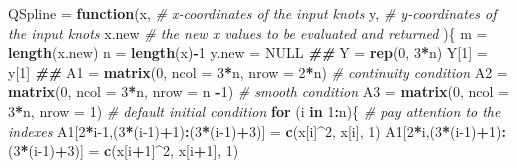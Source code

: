\documentclass[
]{book}
\newenvironment{Shaded}{\begin{snugshade}}{\end{snugshade}}
\newcommand{\AttributeTok}[1]{\textcolor[rgb]{0.13,0.29,0.53}{#1}}
\newcommand{\CommentTok}[1]{\textcolor[rgb]{0.56,0.35,0.01}{\textit{#1}}}
\newcommand{\ConstantTok}[1]{\textcolor[rgb]{0.56,0.35,0.01}{#1}}
\newcommand{\ControlFlowTok}[1]{\textcolor[rgb]{0.13,0.29,0.53}{\textbf{#1}}}
\newcommand{\DecValTok}[1]{\textcolor[rgb]{0.00,0.00,0.81}{#1}}
\newcommand{\DocumentationTok}[1]{\textcolor[rgb]{0.56,0.35,0.01}{\textbf{\textit{#1}}}}
\newcommand{\FunctionTok}[1]{\textcolor[rgb]{0.13,0.29,0.53}{\textbf{#1}}}
\newcommand{\NormalTok}[1]{#1}
\newcommand{\OtherTok}[1]{\textcolor[rgb]{0.56,0.35,0.01}{#1}}
\newcommand{\SpecialCharTok}[1]{\textcolor[rgb]{0.81,0.36,0.00}{\textbf{#1}}}
\begin{document}
\begin{Shaded}
\begin{Highlighting}[]
\NormalTok{QSpline }\OtherTok{=} \ControlFlowTok{function}\NormalTok{(x,        }\CommentTok{\# x{-}coordinates of the input knots}
\NormalTok{                   y,        }\CommentTok{\# y{-}coordinates of the input knots}
\NormalTok{                   x.new     }\CommentTok{\# the new x values to be evaluated and returned}
\NormalTok{              )\{}
\NormalTok{     m }\OtherTok{=} \FunctionTok{length}\NormalTok{(x.new)}
\NormalTok{     n }\OtherTok{=} \FunctionTok{length}\NormalTok{(x)}\SpecialCharTok{{-}}\DecValTok{1}
\NormalTok{     y.new }\OtherTok{=} \ConstantTok{NULL}
     \DocumentationTok{\#\#}
\NormalTok{     Y }\OtherTok{=} \FunctionTok{rep}\NormalTok{(}\DecValTok{0}\NormalTok{, }\DecValTok{3}\SpecialCharTok{*}\NormalTok{n)}
\NormalTok{     Y[}\DecValTok{1}\NormalTok{] }\OtherTok{=}\NormalTok{ y[}\DecValTok{1}\NormalTok{]}
     \DocumentationTok{\#\#}
\NormalTok{     A1 }\OtherTok{=} \FunctionTok{matrix}\NormalTok{(}\DecValTok{0}\NormalTok{, }\AttributeTok{ncol =} \DecValTok{3}\SpecialCharTok{*}\NormalTok{n, }\AttributeTok{nrow =} \DecValTok{2}\SpecialCharTok{*}\NormalTok{n)     }\CommentTok{\# continuity condition}
\NormalTok{     A2 }\OtherTok{=} \FunctionTok{matrix}\NormalTok{(}\DecValTok{0}\NormalTok{, }\AttributeTok{ncol =} \DecValTok{3}\SpecialCharTok{*}\NormalTok{n, }\AttributeTok{nrow =}\NormalTok{ n }\SpecialCharTok{{-}}\DecValTok{1}\NormalTok{)    }\CommentTok{\# smooth condition}
\NormalTok{     A3 }\OtherTok{=} \FunctionTok{matrix}\NormalTok{(}\DecValTok{0}\NormalTok{, }\AttributeTok{ncol =} \DecValTok{3}\SpecialCharTok{*}\NormalTok{n, }\AttributeTok{nrow =} \DecValTok{1}\NormalTok{)       }\CommentTok{\# default initial condition}
     \ControlFlowTok{for}\NormalTok{ (i }\ControlFlowTok{in} \DecValTok{1}\SpecialCharTok{:}\NormalTok{n)\{  }\CommentTok{\# pay attention to the indexes }
\NormalTok{       A1[}\DecValTok{2}\SpecialCharTok{*}\NormalTok{i}\DecValTok{{-}1}\NormalTok{,(}\DecValTok{3}\SpecialCharTok{*}\NormalTok{(i}\DecValTok{{-}1}\NormalTok{)}\SpecialCharTok{+}\DecValTok{1}\NormalTok{)}\SpecialCharTok{:}\NormalTok{(}\DecValTok{3}\SpecialCharTok{*}\NormalTok{(i}\DecValTok{{-}1}\NormalTok{)}\SpecialCharTok{+}\DecValTok{3}\NormalTok{)] }\OtherTok{=} \FunctionTok{c}\NormalTok{(x[i]}\SpecialCharTok{\^{}}\DecValTok{2}\NormalTok{, x[i], }\DecValTok{1}\NormalTok{)}
\NormalTok{       A1[}\DecValTok{2}\SpecialCharTok{*}\NormalTok{i,(}\DecValTok{3}\SpecialCharTok{*}\NormalTok{(i}\DecValTok{{-}1}\NormalTok{)}\SpecialCharTok{+}\DecValTok{1}\NormalTok{)}\SpecialCharTok{:}\NormalTok{(}\DecValTok{3}\SpecialCharTok{*}\NormalTok{(i}\DecValTok{{-}1}\NormalTok{)}\SpecialCharTok{+}\DecValTok{3}\NormalTok{)] }\OtherTok{=} \FunctionTok{c}\NormalTok{(x[i}\SpecialCharTok{+}\DecValTok{1}\NormalTok{]}\SpecialCharTok{\^{}}\DecValTok{2}\NormalTok{, x[i}\SpecialCharTok{+}\DecValTok{1}\NormalTok{], }\DecValTok{1}\NormalTok{)}

\end{Highlighting}
\end{Shaded}
\end{document}
